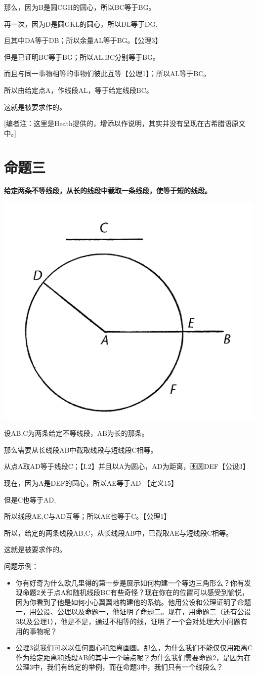\documentclass[
]{book}
\begin{document}
那么，因为B是圆CGH的圆心，所以BC等于BG。

再一次，因为D是圆GKL的圆心，所以DL等于DG.

且其中DA等于DB；所以余量AL等于BG。【公理3】

但是已证明BC等于BG；所以AL,BC分别等于BG。

而且与同一事物相等的事物们彼此互等【公理1】；所以AL等于BC。

所以由给定点A，作线段AL，等于给定线段BC。

这就是被要求作的。

{[}编者注：这里是Heath提供的，增添以作说明，其实并没有呈现在古希腊语原文中。{]}

\hypertarget{ux547dux9898ux4e09}{%
\section{命题三}\label{ux547dux9898ux4e09}}

\textbf{给定两条不等线段，从长的线段中截取一条线段，使等于短的线段。}

\includegraphics[width=0.3\linewidth]{./image/img449}

设AB,C为两条给定不等线段，AB为长的那条。

那么需要从长线段AB中截取线段与短线段C相等。

从点A取AD等于线段C；【I.2】并且以A为圆心，AD为距离，画圆DEF【公设3】

现在，因为A是DEF的圆心，所以AE等于AD 【定义15】

但是C也等于AD,

所以线段AE,C与AD互等；所以AE也等于C。【公理1】

所以，给定的两条线段AB,C，从长线段AB中，已截取AE与短线段C相等。

这就是被要求作的。

问题示例：

\begin{itemize}
\item
  你有好奇为什么欧几里得的第一步是展示如何构建一个等边三角形么？你有发现命题2关于点A和随机线段BC有些奇怪？现在你在的位置可以感受到愉悦，因为你看到了他是如何小心翼翼地构建他的系统。他用公设和公理证明了命题一，用公设、公理以及命题一，他证明了命题二。现在，用命题二（还有公设3以及公理1），他是不是，通过不相等的线，证明了一个会对处理大小问题有用的事物呢？
\item
  公理3说我们可以以任何圆心和距离画圆。那么，为什么我们不能仅仅用距离C作为给定距离和线段AB的其中一个端点呢？为什么我们需要命题2，是因为在公理3中，我们有给定的举例，而在命题3中，我们只有一个线段么？
\end{itemize}
\end{document}
